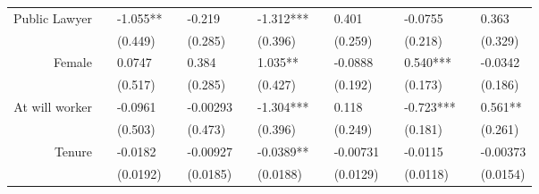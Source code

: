 \begin{tabular}{rrrrrrrrrrrrr}
Public Lawyer & \multicolumn{1}{l}{} & \multicolumn{1}{l}{-1.055**} & \multicolumn{1}{l}{} & \multicolumn{1}{l}{-0.219} & \multicolumn{1}{l}{} & \multicolumn{1}{l}{-1.312***} & \multicolumn{1}{l}{} & \multicolumn{1}{l}{0.401} & \multicolumn{1}{l}{} & \multicolumn{1}{l}{-0.0755} & \multicolumn{1}{l}{} & \multicolumn{1}{l}{0.363} \\
      & \multicolumn{1}{l}{} & \multicolumn{1}{l}{(0.449)} & \multicolumn{1}{l}{} & \multicolumn{1}{l}{(0.285)} & \multicolumn{1}{l}{} & \multicolumn{1}{l}{(0.396)} & \multicolumn{1}{l}{} & \multicolumn{1}{l}{(0.259)} & \multicolumn{1}{l}{} & \multicolumn{1}{l}{(0.218)} & \multicolumn{1}{l}{} & \multicolumn{1}{l}{(0.329)} \\
Female & \multicolumn{1}{l}{} & \multicolumn{1}{l}{0.0747} & \multicolumn{1}{l}{} & \multicolumn{1}{l}{0.384} & \multicolumn{1}{l}{} & \multicolumn{1}{l}{1.035**} & \multicolumn{1}{l}{} & \multicolumn{1}{l}{-0.0888} & \multicolumn{1}{l}{} & \multicolumn{1}{l}{0.540***} & \multicolumn{1}{l}{} & \multicolumn{1}{l}{-0.0342} \\
      & \multicolumn{1}{l}{} & \multicolumn{1}{l}{(0.517)} & \multicolumn{1}{l}{} & \multicolumn{1}{l}{(0.285)} & \multicolumn{1}{l}{} & \multicolumn{1}{l}{(0.427)} & \multicolumn{1}{l}{} & \multicolumn{1}{l}{(0.192)} & \multicolumn{1}{l}{} & \multicolumn{1}{l}{(0.173)} & \multicolumn{1}{l}{} & \multicolumn{1}{l}{(0.186)} \\
At will worker & \multicolumn{1}{l}{} & \multicolumn{1}{l}{-0.0961} & \multicolumn{1}{l}{} & \multicolumn{1}{l}{-0.00293} & \multicolumn{1}{l}{} & \multicolumn{1}{l}{-1.304***} & \multicolumn{1}{l}{} & \multicolumn{1}{l}{0.118} & \multicolumn{1}{l}{} & \multicolumn{1}{l}{-0.723***} & \multicolumn{1}{l}{} & \multicolumn{1}{l}{0.561**} \\
      & \multicolumn{1}{l}{} & \multicolumn{1}{l}{(0.503)} & \multicolumn{1}{l}{} & \multicolumn{1}{l}{(0.473)} & \multicolumn{1}{l}{} & \multicolumn{1}{l}{(0.396)} & \multicolumn{1}{l}{} & \multicolumn{1}{l}{(0.249)} & \multicolumn{1}{l}{} & \multicolumn{1}{l}{(0.181)} & \multicolumn{1}{l}{} & \multicolumn{1}{l}{(0.261)} \\
Tenure & \multicolumn{1}{l}{} & \multicolumn{1}{l}{-0.0182} & \multicolumn{1}{l}{} & \multicolumn{1}{l}{-0.00927} & \multicolumn{1}{l}{} & \multicolumn{1}{l}{-0.0389**} & \multicolumn{1}{l}{} & \multicolumn{1}{l}{-0.00731} & \multicolumn{1}{l}{} & \multicolumn{1}{l}{-0.0115} & \multicolumn{1}{l}{} & \multicolumn{1}{l}{-0.00373} \\
      & \multicolumn{1}{l}{} & \multicolumn{1}{l}{(0.0192)} & \multicolumn{1}{l}{} & \multicolumn{1}{l}{(0.0185)} & \multicolumn{1}{l}{} & \multicolumn{1}{l}{(0.0188)} & \multicolumn{1}{l}{} & \multicolumn{1}{l}{(0.0129)} & \multicolumn{1}{l}{} & \multicolumn{1}{l}{(0.0118)} & \multicolumn{1}{l}{} & \multicolumn{1}{l}{(0.0154)} \\

\end{tabular}
